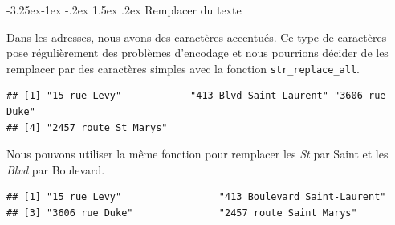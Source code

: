 \documentclass[
  11pt,
  french,
]{book}
\makeatletter
\newenvironment{Shaded}{\begin{snugshade}}{\end{snugshade}}
\newcommand{\DecValTok}[1]{\textcolor[rgb]{0.00,0.00,0.81}{#1}}
\newcommand{\KeywordTok}[1]{\textcolor[rgb]{0.13,0.29,0.53}{\textbf{#1}}}
\newcommand{\NormalTok}[1]{#1}
\newcommand{\OperatorTok}[1]{\textcolor[rgb]{0.81,0.36,0.00}{\textbf{#1}}}
\newcommand{\StringTok}[1]{\textcolor[rgb]{0.31,0.60,0.02}{#1}}
\newenvironment{kframe}{%
\medskip{}
\setlength{\fboxsep}{.8em}
 \def\at@end@of@kframe{}%
 \ifinner\ifhmode%
  \def\at@end@of@kframe{\end{minipage}}%
  \begin{minipage}{\columnwidth}%
 \fi\fi%
 \def\FrameCommand##1{\hskip\@totalleftmargin \hskip-\fboxsep
 \colorbox{shadecolor}{##1}\hskip-\fboxsep
     \hskip-\linewidth \hskip-\@totalleftmargin \hskip\columnwidth}%
 \MakeFramed {\advance\hsize-\width
   \@totalleftmargin\z@ \linewidth\hsize
   \@setminipage}}%
 {\par\unskip\endMakeFramed%
 \at@end@of@kframe}
\renewenvironment{Shaded}{\begin{kframe}}{\end{kframe}}
\renewcommand\paragraph{\@startsection{paragraph}{4}{\z@}%
   {-3.25ex\@plus -1ex \@minus -.2ex}%
   {1.5ex \@plus .2ex}%
   {\normalfont\normalsize\bfseries}}
\makeatother
\begin{document}
\hypertarget{sect014252}{%
\paragraph{Remplacer du texte}\label{sect014252}}

Dans les adresses, nous avons des caractères accentués. Ce type de caractères pose régulièrement des problèmes d'encodage et nous pourrions décider de les remplacer par des caractères simples avec la fonction \texttt{str\_replace\_all}.

\begin{Shaded}
\end{Shaded}

\begin{verbatim}
## [1] "15 rue Levy"            "413 Blvd Saint-Laurent" "3606 rue Duke"         
## [4] "2457 route St Marys"
\end{verbatim}

Nous pouvons utiliser la même fonction pour remplacer les \emph{St} par Saint et les \emph{Blvd} par Boulevard.

\begin{Shaded}
\end{Shaded}

\begin{verbatim}
## [1] "15 rue Levy"                 "413 Boulevard Saint-Laurent"
## [3] "3606 rue Duke"               "2457 route Saint Marys"
\end{verbatim}
\end{document}
